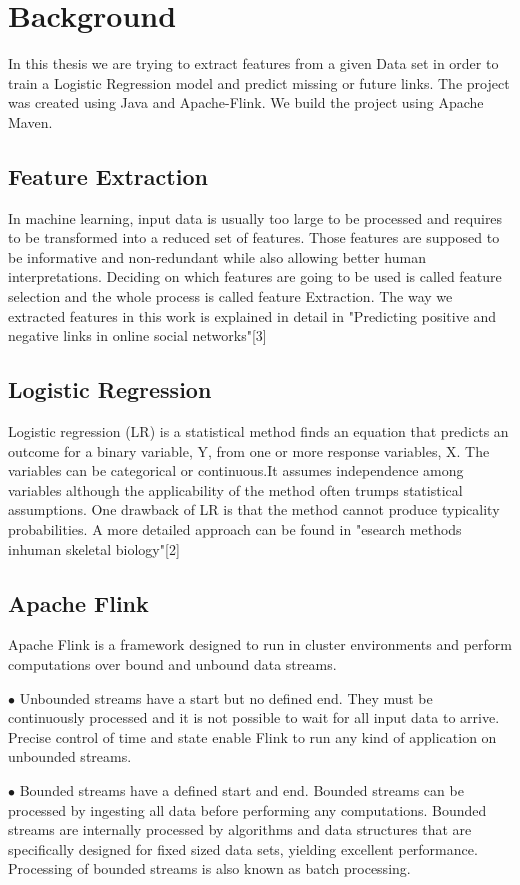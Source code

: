 
\chapter{Background}

In this thesis we are trying to extract features from a given Data set in order to train a Logistic Regression model and predict missing or future links.
The project was created using Java and Apache-Flink. We build the project using Apache Maven. 
 





\section{Feature Extraction}
In machine learning, input data is usually too large to be processed and requires to be transformed into a reduced set of features. Those features are supposed to be informative and non-redundant while also allowing better human interpretations. Deciding on which features are going to be used is called feature selection and the whole process is called feature Extraction. The way we extracted features in this work is explained in detail in "Predicting positive and negative links in online social networks"[3] 
\section{Logistic Regression}
Logistic regression (LR) is a statistical method finds an equation that predicts an outcome for a binary variable, Y, from one or more response variables, X. The variables can be categorical or continuous.It assumes independence among variables although the applicability of the method often trumps statistical assumptions. One drawback of LR is that the method cannot produce typicality probabilities. A more detailed approach can be found in "esearch methods inhuman skeletal biology"[2]

\section{Apache Flink}

Apache Flink is a framework designed to run in cluster environments and perform computations over bound and unbound data streams. 
    \begin{description}
    \item $\bullet$ Unbounded streams have a start but no defined end. They must be continuously processed and it is not possible to wait for all input data to arrive.
    Precise control of time and state enable Flink to run any kind of application on unbounded streams. 

    \item $\bullet$ Bounded streams have a defined start and end. Bounded streams can be processed by ingesting all data before performing any computations. Bounded streams are internally processed by algorithms and data structures that are specifically designed for fixed sized data sets, yielding excellent performance.
    Processing of bounded streams is also known as batch processing.
    \end{description}
    
